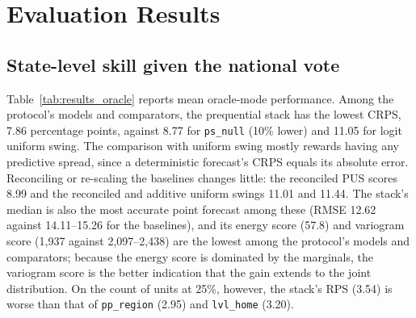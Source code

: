 \documentclass[preprint,12pt,authoryear]{elsarticle}
\begin{document}
\section{Evaluation Results}
\label{sec:experiments}

\subsection{State-level skill given the national vote}
Table~\ref{tab:results_oracle} reports mean oracle-mode performance. Among the protocol's models and comparators, the prequential stack has the lowest CRPS, 7.86 percentage points, against 8.77 for \texttt{ps\_null} (10\% lower) and 11.05 for logit uniform swing. The comparison with uniform swing mostly rewards having any predictive spread, since a deterministic forecast's CRPS equals its absolute error. Reconciling or re-scaling the baselines changes little: the reconciled PUS scores 8.99 and the reconciled and additive uniform swings 11.01 and 11.44. The stack's median is also the most accurate point forecast among these (RMSE 12.62 against 14.11--15.26 for the baselines), and its energy score (57.8) and variogram score (1,937 against 2,097--2,438) are the lowest among the protocol's models and comparators; because the energy score is dominated by the marginals, the variogram score is the better indication that the gain extends to the joint distribution. On the count of units at 25\%, however, the stack's RPS (3.54) is worse than that of \texttt{pp\_region} (2.95) and \texttt{lvl\_home} (3.20).
\end{document}

